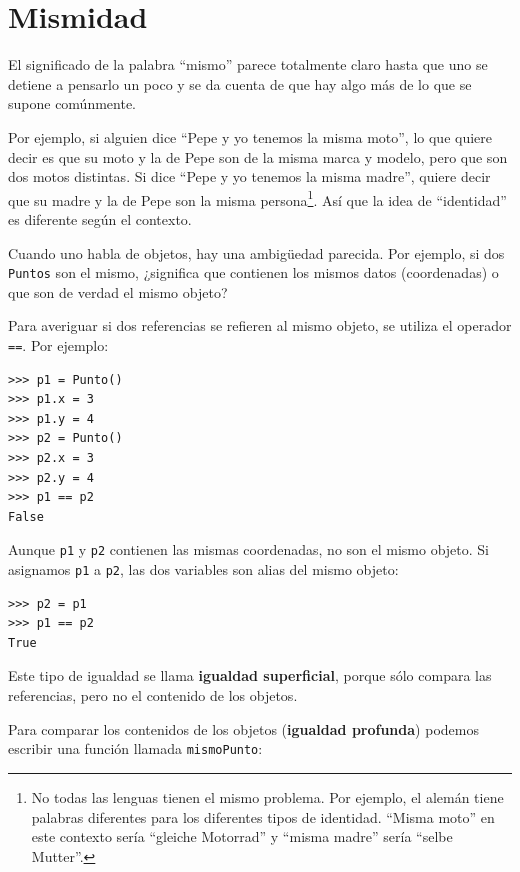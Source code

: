 \section{Mismidad}


El significado de la palabra ``mismo'' parece totalmente claro hasta
que uno se detiene a pensarlo un poco y se da cuenta de que hay algo
más de lo que se supone comúnmente.

  

Por ejemplo, si alguien dice ``Pepe y yo tenemos la misma moto'',
lo que quiere decir es que su moto y la de Pepe son de la misma marca
y modelo, pero que son dos motos distintas. Si dice ``Pepe y yo tenemos
la misma madre'', quiere decir que su madre y la de Pepe son la misma
persona\footnote{No todas las lenguas tienen el mismo problema. Por ejemplo, el alemán
tiene palabras diferentes para los diferentes tipos de identidad.
``Misma moto'' en este contexto sería ``gleiche Motorrad'' y ``misma
madre'' sería ``selbe Mutter''.}. Así que la idea de ``identidad'' es diferente según el contexto.

Cuando uno habla de objetos, hay una ambigüedad parecida. Por ejemplo,
si dos \texttt{Puntos} son el mismo, ¿significa que contienen los
mismos datos (coordenadas) o que son de verdad el mismo objeto?

Para averiguar si dos referencias se refieren al mismo objeto, se
utiliza el operador \texttt{==}. Por ejemplo:
\begin{lstlisting}
>>> p1 = Punto()
>>> p1.x = 3
>>> p1.y = 4
>>> p2 = Punto()
>>> p2.x = 3
>>> p2.y = 4
>>> p1 == p2
False
\end{lstlisting}
Aunque \texttt{p1} y \texttt{p2} contienen las mismas coordenadas,
no son el mismo objeto. Si asignamos \texttt{p1} a \texttt{p2}, las
dos variables son alias del mismo objeto:
\begin{lstlisting}
>>> p2 = p1
>>> p1 == p2
True
\end{lstlisting}
Este tipo de igualdad se llama \textbf{igualdad superficial}, porque
sólo compara las referencias, pero no el contenido de los objetos.

  

Para comparar los contenidos de los objetos (\textbf{igualdad profunda})
podemos escribir una función llamada \texttt{mismoPunto}:

